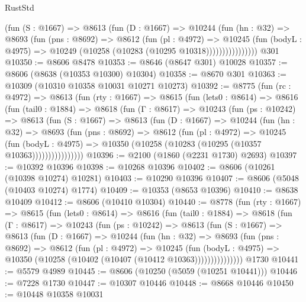 \begin{lexlean}{RustStd}
\begin{coremodule}
                  (fun (S : @1667) =>
                  @8613
                    (fun (D : @1667) =>
                    @10244
                      (fun (hn : @32) =>
                      @8693
                        (fun (pns : @8692) =>
                        @8612
                          (fun (pl : @4972) =>
                          @10245
                            (fun (bodyL : @4975) =>
                            @10249 (@10258 (@10283 (@10295 @10318))))))))))))))))
    @301
@10350 := @8606 @8478
@10353 := @8646 (@8647 @301) @10028
@10357 := @8606 (@8638 (@10353 @10300) @10304)
@10358 := @8670 @301
@10363 := @10309 (@10310 @10358 @10031 @10271 @10273)
@10392 := @8775
    (fun (rc : @4972) =>
    @8613
      (fun (rty : @1667) =>
      @8615
        (fun (lets0 : @8614) =>
        @8616
          (fun (tail0 : @1884) =>
          @8618
            (fun (Γ : @8617) =>
            @10243
              (fun (ps : @10242) =>
              @8613
                (fun (S : @1667) =>
                @8613
                  (fun (D : @1667) =>
                  @10244
                    (fun (hn : @32) =>
                    @8693
                      (fun (pns : @8692) =>
                      @8612
                        (fun (pl : @4972) =>
                        @10245
                          (fun (bodyL : @4975) =>
                          @10350 (@10258 (@10283 (@10295 (@10357 @10363))))))))))))))))
@10396 := @2100 (@1860 (@2231 @1730) @2693)
@10397 := @10392 @10396
@10398 := @10268 @10396
@10402 := @8606 (@10261 (@10398 @10274) @10281)
@10403 := @10290 @10396
@10407 := @8606 (@5048 (@10403 @10274) @1774)
@10409 := @10353 (@8653 @10396)
@10410 := @8638 @10409
@10412 := @8606 (@10410 @10304)
@10440 := @8778
    (fun (rty : @1667) =>
    @8615
      (fun (lets0 : @8614) =>
      @8616
        (fun (tail0 : @1884) =>
        @8618
          (fun (Γ : @8617) =>
          @10243
            (fun (ps : @10242) =>
            @8613
              (fun (S : @1667) =>
              @8613
                (fun (D : @1667) =>
                @10244
                  (fun (hn : @32) =>
                  @8693
                    (fun (pns : @8692) =>
                    @8612
                      (fun (pl : @4972) =>
                      @10245
                        (fun (bodyL : @4975) =>
                        @10350 (@10258 (@10402 (@10407 (@10412 @10363)))))))))))))))
    @1730
@10441 := @5579 @4989
@10445 := @8606 (@10250 (@5059 (@10251 @10441)))
@10446 := @7228 @1730
@10447 := @10307 @10446
@10448 := @8668 @10446
@10450 := @10448 @10358 @10031

\end{coremodule}
\end{lexlean}
